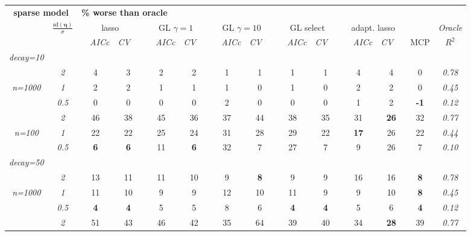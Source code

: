 \begin{table}
\footnotesize
\begin{center}
\begin{tabular}{cc|cc|cc|cc|cc|cc|c|c}
\multicolumn{2}{c|}{\bf sparse model} & \multicolumn{11}{l|}{\bf \% worse than oracle } & \\[1ex]
& \multirow{2}{*}{$\displaystyle\frac{\mathrm{sd}(\boldsymbol{\eta})}{\sigma}$} 
& \multicolumn{2}{c}{lasso} 
& \multicolumn{2}{c}{GL $\gamma=1$} 
& \multicolumn{2}{c}{GL $\gamma=10$} 
& \multicolumn{2}{c}{GL select} 
& \multicolumn{2}{c}{ adapt. lasso} 
& \multicolumn{1}{c|}{~} & \it Oracle \\[-0.5ex]
& 
& ~~\scriptsize\it AICc & \multicolumn{1}{c}{\scriptsize\it CV~~}
& ~~\scriptsize\it AICc & \multicolumn{1}{c}{\scriptsize\it CV~~}
& ~~\scriptsize\it AICc & \multicolumn{1}{c}{\scriptsize\it CV~~}
& ~~\scriptsize\it AICc & \multicolumn{1}{c}{\scriptsize\it CV~~}
& ~~\scriptsize\it AICc & \multicolumn{1}{c}{\scriptsize\it CV~~} 
& \multicolumn{1}{c|}{ MCP} & $R^2$ \\[1ex]
\hline\rule{0pt}{3ex}
{\it decay=10} &&&&&&&&&&&&\\
& \it  2  & 4 & 3 & 2 & 2 & 1 & 1 & 1 & 1 & 4 & 4 & 0 & \it  0.78 \\
\it n=1000  & \it  1  & 2 & 2 & 1 & 1 & 1 & 0 & 1 & 0 & 2 & 2 & 0 & \it  0.45 \\
& \it  0.5  & 0 & 0 & 0 & 0 & 2 & 0 & 0 & 0 & 1 & 2 & {\bf -1} & \it  0.12 \\[1ex]
\cline{2-2}\rule{0pt}{3ex}& \it  2  & 46 & 38 & 45 & 36 & 37 & 44 & 38 & 35 & 31 & {\bf 26} & 32 & \it  0.77 \\
\it n=100  & \it  1  & 22 & 22 & 25 & 24 & 31 & 28 & 29 & 22 & {\bf 17} & 26 & 22 & \it  0.44 \\
& \it  0.5  & {\bf 6} & {\bf 6} & 11 & {\bf 6} & 32 & 7 & 27 & 7 & 9 & 26 & 7 & \it  0.10 \\[1ex]
\hline\rule{0pt}{3ex}{\it decay=50} &&&&&&&&&&&&\\
& \it  2  & 13 & 11 & 11 & 10 & 9 & {\bf 8} & 9 & 9 & 16 & 16 & {\bf 8} & \it  0.78 \\
\it n=1000  & \it  1  & 11 & 10 & 9 & 9 & 12 & 10 & 11 & 9 & 9 & 10 & {\bf 8} & \it  0.45 \\
& \it  0.5  & {\bf 4} & {\bf 4} & 5 & 5 & 8 & 6 & {\bf 4} & {\bf 4} & 5 & 6 & {\bf 4} & \it  0.12 \\[1ex]
\cline{2-2}\rule{0pt}{3ex}& \it  2  & 51 & 43 & 46 & 42 & 35 & 64 & 39 & 40 & 34 & {\bf 28} & 39 & \it  0.77 \\

\end{tabular}
\end{center}
\end{table}
